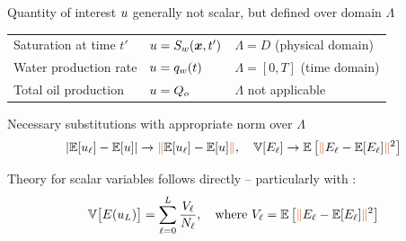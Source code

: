 \begin{frame}{\name{}}
    \begin{overlayarea}{\textwidth}{\frameheight}
        \vspace{1em}
        \begin{squarelist}
            \item<1-> Quantity of interest $u$ generally not scalar, but defined over domain $\Lambda$
            \begin{center}
                \small%
                \begin{tabular}{l|l|l}
                    Saturation at time $t'$ & $u = S_w(\bm{x}, t')$ & $\Lambda = D$ (physical domain)\\
                    Water production rate & $u = q_w(t)$ & $\Lambda = [0,T]$ (time domain) \\
                    Total oil production & $u = Q_o$ & $\Lambda$ not applicable
                \end{tabular}
            \end{center}
            \vspace{0.5em}
            \item<2-> Necessary substitutions with appropriate norm \redtext{$\|\cdot\|$} over $\Lambda$
            \begin{equation*}
                |\expect[\un_\ell] - \expect[\un]| \rightarrow \redtext{\|}\expect[\un_\ell] - \expect[\un]\redtext{\|}, \quad \var[\expecta_\ell] \rightarrow \expect\left[\redtext{\|}\expecta_\ell - \expect[\expecta_\ell]\redtext{\|}^2\right]
            \end{equation*}
            \item<3-> Theory for scalar variables follows directly -- particularly with :
            \begin{equation*}
                \var\big[\expecta(\un_\nlev)\big] = \sum_{\ell = 0}^\nlev \frac{\vara_\ell}{\nsamp_\ell}, \quad \text{where } \vara_\ell = \expect\left[\redtext{\|}\expecta_\ell - \expect[\expecta_\ell]\redtext{\|}^2\right]
            \end{equation*}
        \end{squarelist}
    \end{overlayarea}
\end{frame}

